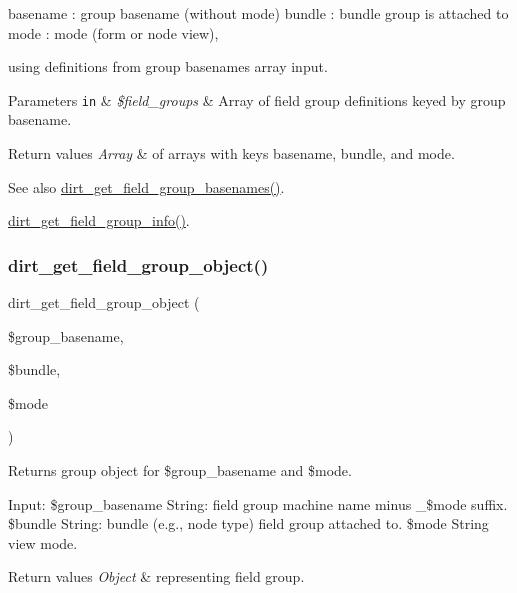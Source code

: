 \textquotesingle{}basename\textquotesingle{} \+: group basename (without mode) \textquotesingle{}bundle\textquotesingle{} \+: bundle group is attached to \textquotesingle{}mode\textquotesingle{} \+: mode (form or node view),

using definitions from group basenames array input.


\begin{DoxyParams}[1]{Parameters}
\mbox{\tt in}  & {\em \$field\+\_\+groups} & Array of field group definitions keyed by group basename.\\
\hline
\end{DoxyParams}

\begin{DoxyRetVals}{Return values}
{\em Array} & of arrays with keys \textquotesingle{}basename\textquotesingle{}, \textquotesingle{}bundle\textquotesingle{}, and \textquotesingle{}mode\textquotesingle{}.\\
\hline
\end{DoxyRetVals}
\begin{DoxySeeAlso}{See also}
\mbox{\hyperlink{dirt_8field__groups_8inc_aebe241946b4cdcfebd57e57dae89dbd1}{dirt\+\_\+get\+\_\+field\+\_\+group\+\_\+basenames()}}. 

\mbox{\hyperlink{dirt_8field__groups_8inc_ad57a6faa7b4f0fc6c40b2a9d19776ed2}{dirt\+\_\+get\+\_\+field\+\_\+group\+\_\+info()}}. 
\end{DoxySeeAlso}
\mbox{\label{dirt_8field__groups_8inc_ae0784b05afc41e0e23317d20c84c85ad}} 
\subsubsection{\texorpdfstring{dirt\+\_\+get\+\_\+field\+\_\+group\+\_\+object()}{dirt\_get\_field\_group\_object()}}
{\footnotesize\ttfamily dirt\+\_\+get\+\_\+field\+\_\+group\+\_\+object (\begin{DoxyParamCaption}\item[{}]{\$group\+\_\+basename,  }\item[{}]{\$bundle,  }\item[{}]{\$mode }\end{DoxyParamCaption})}

Returns group object for \$group\+\_\+basename and \$mode.

Input\+: \$group\+\_\+basename String\+: field group machine name minus \textquotesingle{}\+\_\+\$mode\textquotesingle{} suffix. \$bundle String\+: bundle (e.\+g., node type) field group attached to. \$mode String view mode.


\begin{DoxyRetVals}{Return values}
{\em Object} & representing field group. \\
\hline
\end{DoxyRetVals}
